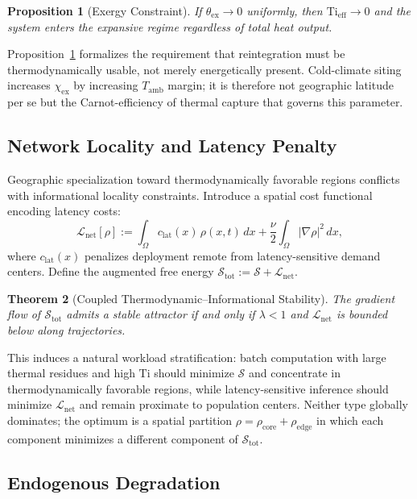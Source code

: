 \documentclass[10pt,twocolumn]{article}
\theoremstyle{plain}
\newtheorem{theorem}{Theorem}
\newtheorem{proposition}[theorem]{Proposition}
\theoremstyle{definition}
\theoremstyle{remark}
\begin{document}
\begin{proposition}[Exergy Constraint]
\label{prop:exergy}
If $\theta_{\mathrm{ex}} \to 0$ uniformly, then
$\mathrm{Ti}_{\mathrm{eff}} \to 0$ and the system enters the expansive
regime regardless of total heat output.
\end{proposition}

Proposition~\ref{prop:exergy} formalizes the requirement that
reintegration must be thermodynamically usable, not merely energetically
present. Cold-climate siting increases $\chi_{\mathrm{ex}}$ by
increasing $T_{\mathrm{amb}}$ margin; it is therefore not geographic
latitude per se but the Carnot-efficiency of thermal capture that
governs this parameter.

\subsection{Network Locality and Latency Penalty}

Geographic specialization toward thermodynamically favorable regions
conflicts with informational locality constraints. Introduce a spatial
cost functional encoding latency costs:
\[
  \mathcal{L}_{\mathrm{net}}[\rho]
  := \int_\Omega c_{\mathrm{lat}}(x)\,\rho(x,t)\,dx
  + \frac{\nu}{2}\int_\Omega |\nabla\rho|^2\,dx,
\]
where $c_{\mathrm{lat}}(x)$ penalizes deployment remote from
latency-sensitive demand centers. Define the augmented free energy
$\mathcal{S}_{\mathrm{tot}} := \mathcal{S} + \mathcal{L}_{\mathrm{net}}$.

\begin{theorem}[Coupled Thermodynamic--Informational Stability]
The gradient flow of $\mathcal{S}_{\mathrm{tot}}$ admits a stable
attractor if and only if $\lambda < 1$ and
$\mathcal{L}_{\mathrm{net}}$ is bounded below along trajectories.
\end{theorem}

This induces a natural workload stratification: batch computation
with large thermal residues and high $\mathrm{Ti}$ should minimize
$\mathcal{S}$ and concentrate in thermodynamically favorable regions,
while latency-sensitive inference should minimize
$\mathcal{L}_{\mathrm{net}}$ and remain proximate to population
centers. Neither type globally dominates; the optimum is a spatial
partition $\rho = \rho_{\mathrm{core}} + \rho_{\mathrm{edge}}$ in
which each component minimizes a different component of
$\mathcal{S}_{\mathrm{tot}}$.

\subsection{Endogenous Degradation}
\end{document}
